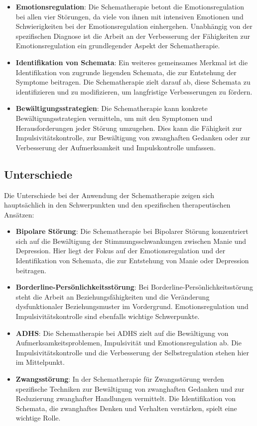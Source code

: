 \begin{itemize}
  \item \textbf{Emotionsregulation}: Die Schematherapie betont die Emotionsregulation bei allen vier Störungen, da viele von ihnen mit intensiven Emotionen und Schwierigkeiten bei der Emotionsregulation einhergehen. Unabhängig von der spezifischen Diagnose ist die Arbeit an der Verbesserung der Fähigkeiten zur Emotionsregulation ein grundlegender Aspekt der Schematherapie.
  
  \item \textbf{Identifikation von Schemata}: Ein weiteres gemeinsames Merkmal ist die Identifikation von zugrunde liegenden Schemata, die zur Entstehung der Symptome beitragen. Die Schematherapie zielt darauf ab, diese Schemata zu identifizieren und zu modifizieren, um langfristige Verbesserungen zu fördern.
  
  \item \textbf{Bewältigungsstrategien}: Die Schematherapie kann konkrete Bewältigungsstrategien vermitteln, um mit den Symptomen und Herausforderungen jeder Störung umzugehen. Dies kann die Fähigkeit zur Impulsivitätskontrolle, zur Bewältigung von zwanghaften Gedanken oder zur Verbesserung der Aufmerksamkeit und Impulskontrolle umfassen.
\end{itemize}

\subsection{Unterschiede}

Die Unterschiede bei der Anwendung der Schematherapie zeigen sich hauptsächlich in den Schwerpunkten und den spezifischen therapeutischen Ansätzen:

\begin{itemize}
  \item \textbf{Bipolare Störung}: Die Schematherapie bei Bipolarer Störung konzentriert sich auf die Bewältigung der Stimmungsschwankungen zwischen Manie und Depression. Hier liegt der Fokus auf der Emotionsregulation und der Identifikation von Schemata, die zur Entstehung von Manie oder Depression beitragen.
  
  \item \textbf{Borderline-Persönlichkeitsstörung}: Bei Borderline-Persönlichkeitsstörung steht die Arbeit an Beziehungsfähigkeiten und die Veränderung dysfunktionaler Beziehungsmuster im Vordergrund. Emotionsregulation und Impulsivitätskontrolle sind ebenfalls wichtige Schwerpunkte.
  
  \item \textbf{ADHS}: Die Schematherapie bei ADHS zielt auf die Bewältigung von Aufmerksamkeitsproblemen, Impulsivität und Emotionsregulation ab. Die Impulsivitätskontrolle und die Verbesserung der Selbstregulation stehen hier im Mittelpunkt.
  
  \item \textbf{Zwangsstörung}: In der Schematherapie für Zwangsstörung werden spezifische Techniken zur Bewältigung von zwanghaften Gedanken und zur Reduzierung zwanghafter Handlungen vermittelt. Die Identifikation von Schemata, die zwanghaftes Denken und Verhalten verstärken, spielt eine wichtige Rolle.
\end{itemize}


